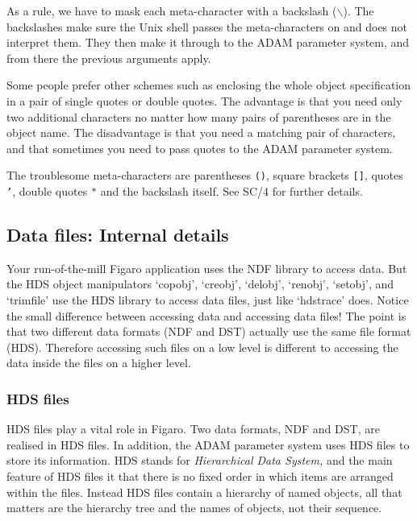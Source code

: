 \documentclass[11pt,twoside]{article}
\newcommand{\stardocinitials}  {SUN}
\newcommand{\stardocnumber}    {86.21}
\newcommand{\stardocname}{\stardocinitials /\stardocnumber}
\newcommand{\xref}[3]{#1}
\newcommand{\xlabel}[1]{}
\begin{document}
   As a rule, we have to mask each meta-character with a backslash
   ($\backslash$). The backslashes make
   sure the Unix shell passes the meta-characters on and does not
   interpret them. They then make it through to the ADAM parameter
   system, and from there the previous arguments apply.

   Some people prefer other schemes such as enclosing the whole
   object specification in a pair of single quotes or double
   quotes. The advantage is that you need only two additional
   characters no matter how many pairs of parentheses are in the
   object name. The disadvantage is that you need a matching pair of
   characters, and that sometimes you need to pass quotes to the ADAM
   parameter system.

   The troublesome meta-characters are parentheses {\tt ()}, square
   brackets {\tt []}, quotes {\tt '}, double quotes {\tt "} and the
   backslash itself.  See \xref{SC/4}{sc4}{} for further details.


\subsection{\xlabel{files}\label{files}Data files: Internal details}
\markboth{Advanced users: Data files}{\stardocname}

   Your run-of-the-mill Figaro application uses the NDF library to
   access data. But the HDS object manipulators `copobj', `creobj',
   `delobj', `renobj', `setobj', and `trimfile' use the HDS library to
   access data files, just like `hdstrace' does. Notice the small
   difference between accessing data and accessing data files! The
   point is that two different data formats (NDF and DST) actually use
   the same file format (HDS). Therefore accessing such files on a low
   level is different to accessing the data inside the files on a
   higher level.


\subsubsection{\label{fileshds}HDS files}

   HDS files play a vital role in Figaro. Two data formats, NDF and
   DST, are realised in HDS files. In addition, the ADAM parameter
   system uses HDS files to store its information. HDS stands for
{\em Hierarchical Data System,\/}
   and the main feature of HDS files it that there is no fixed order in
   which items are arranged within the files. Instead HDS files contain
   a hierarchy of named objects, all that matters are the hierarchy tree
   and the names of objects, not their sequence.
\end{document}
